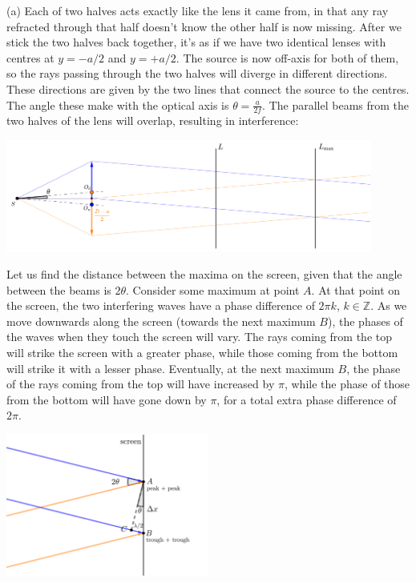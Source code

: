 \documentclass[../TST.tex]{subfiles}
\begin{document}
\ifprob \else
\begin{solution}
(a) Each of two halves acts exactly like the lens it came from, in that any ray refracted through that half doesn't know the other half is now missing. After we stick the two halves back together, it's as if we have two identical lenses with centres at $y=-a/2$ and $y=+a/2$. The source is now off-axis for both of them, so the rays passing through the two halves will diverge in different directions. These directions are given by the two lines that connect the source to the centres. The angle these make with the optical axis is $\theta = \frac{a}{2f}$.  The parallel beams from the two halves of the lens will overlap, resulting in interference:\\
\begin{center}
\includegraphics[width=0.9\textwidth]{fig/a2009_s61.pdf}
\end{center}

Let us find the distance between the maxima on the screen, given that the angle between the beams is $2\theta$. Consider some maximum at point $A$. At that point on the screen, the two interfering waves have a phase difference of $2\pi k$, $k\in \mathbb{Z}$. As we move downwards along the screen (towards the next maximum $B$), the phases of the waves when they touch the screen will vary. The rays coming from the top will strike the screen with a greater phase, while those coming from the bottom will strike it with a lesser phase. Eventually, at the next maximum $B$, the phase of the rays coming from the top will have increased by $\pi$, while the phase of those from the bottom will have gone down by $\pi$, for a total extra phase difference of $2\pi$. 
\begin{center}
	\hspace{1cm}
\includegraphics[width=0.5\textwidth]{fig/a2009_s62.pdf}
\end{center}


\end{solution}
\end{document}
